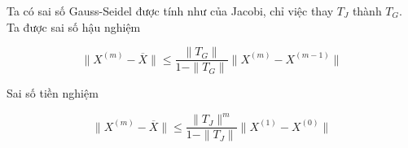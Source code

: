 Ta có sai số Gauss-Seidel được tính như của Jacobi, chỉ việc thay $T_J$ thành $T_G$. Ta được sai số hậu nghiệm

\begin{equation}
    \|X^{(m)} - \overline{X}\| \le \frac{\|T_G\|}{1 - \|T_G\|} \|X^{(m)} - X^{(m-1)}\|
\end{equation}

Sai số tiền nghiệm 

\begin{equation}
    \|X^{(m)} - \overline{X}\| \le \frac{\|T_J\|^m}{1 - \|T_J\|} \|X^{(1)} - X^{(0)}\|
\end{equation}

